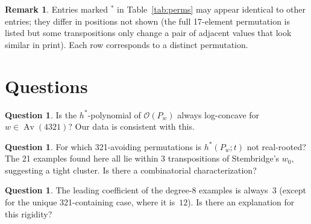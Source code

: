 \documentclass[11pt,reqno]{amsart}
\theoremstyle{definition}
\newtheorem{remark}[theorem]{Remark}
\newtheorem{question}[theorem]{Question}
\begin{document}
\begin{remark}
Entries marked $^{*}$ in Table~\ref{tab:perms} may appear identical
to other entries; they differ in positions not shown (the full
17-element permutation is listed but some transpositions only
change a pair of adjacent values that look similar in print).
Each row corresponds to a distinct permutation.
\end{remark}


\section{Questions}\label{sec:questions}

\begin{question}
Is the $h^*$-polynomial of $\mathcal{O}(P_w)$ always log-concave
for $w \in \operatorname{Av}(4321)$?
Our data is consistent with this.
\end{question}

\begin{question}
For which 321-avoiding permutations is $h^*(P_w; t)$ not real-rooted?
The 21 examples found here all lie within 3 transpositions of
Stembridge's $w_0$, suggesting a tight cluster.
Is there a combinatorial characterization?
\end{question}

\begin{question}
The leading coefficient of the degree-8 examples is always~$3$
(except for the unique 321-containing case, where it is~$12$).
Is there an explanation for this rigidity?
\end{question}




\end{document}
